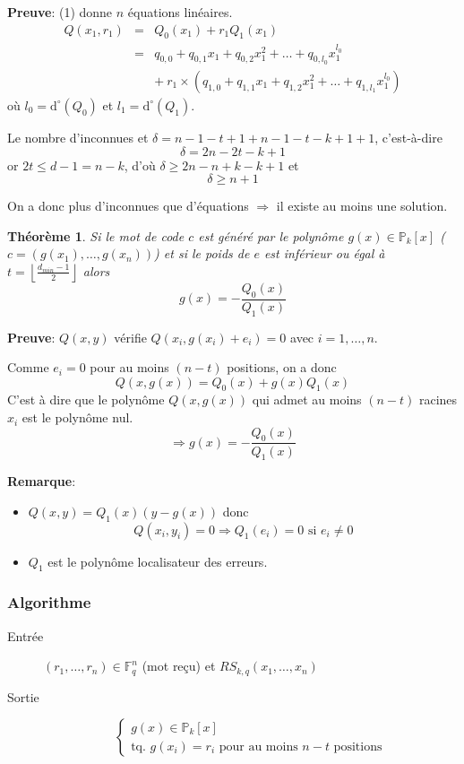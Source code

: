 \documentclass[a4paper,10pt,twocolumn]{article}
\theoremstyle{break}
\newcommand{\F}{\mathbb{F}}
\newcommand{\Poly}{\mathbb{P}}
\newcommand{\dg}[1]{\mathrm{d}^\circ(#1)}
\newtheorem{myth}{Théorème}
\newenvironment{note}[1]
{\textbf{#1}:}
{}
\newenvironment{myproof}
{\begin{note}{Preuve}}
{\end{note}}
\newenvironment{remarque}
{\begin{note}{Remarque}}
{\end{note}}
\begin{document}
\begin{myproof}
 (1) donne $n$ équations linéaires.
 \begin{eqnarray*}
 Q(x_1,r_1) & = & Q_0(x_1) + r_1Q_1(x_1) \\
 & = & q_{0,0} + q_{0,1}x_1 + q_{0,2}x_1^2 + \ldots + q_{0,l_0}x_1^{l_0} \\
 & & +\ r_1 \times (q_{1,0} + q_{1,1}x_1 + q_{1,2}x_1^2 + \ldots + q_{1,l_1}x_1^{l_0})
 \end{eqnarray*}
 où $l_0 = \dg{Q_0}$ et $l_1 = \dg{Q_1}$.

 Le nombre d'inconnues et $\delta = n-1-t+1+n-1-t-k+1+1$, c'est-à-dire
 $$\delta = 2n-2t-k+1$$
 or $2t \le d-1 = n-k$, d'où $\delta \ge 2n -n+k-k+1$ et 
 $$\delta \ge n+1$$
 
 On a donc plus d'inconnues que d'équations $\Rightarrow$ il existe au moins une solution.
\end{myproof}

\begin{myth}
 Si le mot de code $c$ est généré par le polynôme $g(x) \in \Poly_k[x]$ ($c=(g(x_1), \ldots, g(x_n))$)
 et si le poids de $e$ est inférieur ou égal à $t = \left\lfloor \frac{d_{min}-1}{2} \right\rfloor$ alors
 $$ g(x) = - \frac{Q_0(x)}{Q_1(x)} $$
\end{myth}

\begin{myproof}
 $Q(x,y)$ vérifie $Q(x_i, g(x_i) + e_i) = 0$ avec $i=1,\ldots,n$.
 
 Comme $e_i = 0$ pour au moins $(n-t)$ positions, on a donc 
 $$ Q(x,g(x)) = Q_0(x) + g(x)Q_1(x) $$
 C'est à dire que le polynôme $Q(x,g(x))$ qui admet au moins $(n-t)$ racines $x_i$ est le polynôme nul.
 $$ \Rightarrow g(x) = - \frac{Q_0(x)}{Q_1(x)} $$
 
 \begin{remarque}
  \begin{itemize}
   \item $Q(x,y) = Q_1(x)(y - g(x))$ donc 
     $$ Q(x_i,y_i) = 0 \Longrightarrow Q_1(e_i) = 0 \text{ si } e_i \ne 0 $$
   \item $Q_1$ est le polynôme localisateur des erreurs.
  \end{itemize}
 \end{remarque}
\end{myproof}

\subsubsection{Algorithme}
\begin{description}
 \item[Entrée] $(r_1, \ldots, r_n) \in \F_q^n$ (mot reçu) et $RS_{k,q}(x_1, \ldots, x_n)$
 \item[Sortie]
  $$ \left \{ \begin{array}{l}
  g(x) \in \Poly_k[x] \\
  \text{tq. } g(x_i) = r_i \text{ pour au moins $n-t$ positions}
  \end{array} \right. $$
\end{description}
\end{document}
